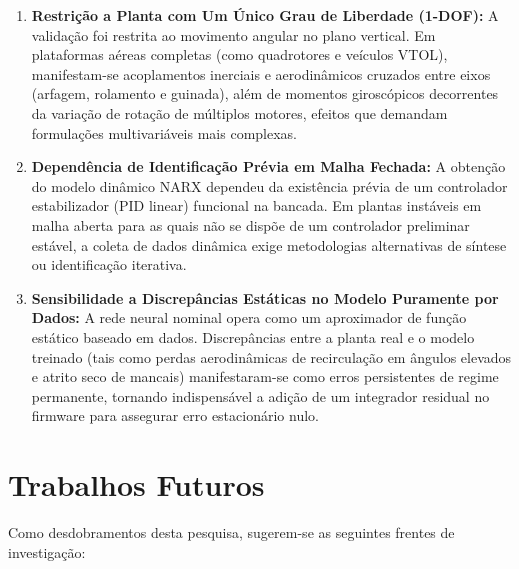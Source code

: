 \begin{enumerate}
    \item \textbf{Restrição a Planta com Um Único Grau de Liberdade (1-DOF):} A validação foi restrita ao movimento angular no plano vertical. Em plataformas aéreas completas (como quadrotores e veículos VTOL), manifestam-se acoplamentos inerciais e aerodinâmicos cruzados entre eixos (arfagem, rolamento e guinada), além de momentos giroscópicos decorrentes da variação de rotação de múltiplos motores, efeitos que demandam formulações multivariáveis mais complexas.
    
    \item \textbf{Dependência de Identificação Prévia em Malha Fechada:} A obtenção do modelo dinâmico NARX dependeu da existência prévia de um controlador estabilizador (PID linear) funcional na bancada. Em plantas instáveis em malha aberta para as quais não se dispõe de um controlador preliminar estável, a coleta de dados dinâmica exige metodologias alternativas de síntese ou identificação iterativa.
    
    \item \textbf{Sensibilidade a Discrepâncias Estáticas no Modelo Puramente por Dados:} A rede neural nominal opera como um aproximador de função estático baseado em dados. Discrepâncias entre a planta real e o modelo treinado (tais como perdas aerodinâmicas de recirculação em ângulos elevados e atrito seco de mancais) manifestaram-se como erros persistentes de regime permanente, tornando indispensável a adição de um integrador residual no firmware para assegurar erro estacionário nulo.
    

    
\end{enumerate}

\section{Trabalhos Futuros}
\label{sec:conclusao_futuros}

Como desdobramentos desta pesquisa, sugerem-se as seguintes frentes de investigação:

